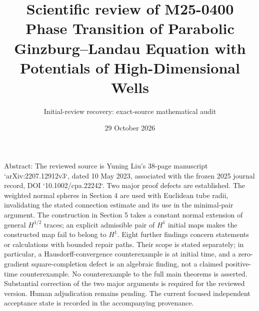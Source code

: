 \documentclass[10pt]{article}
\title{Scientific review of M25-0400
Phase Transition of Parabolic Ginzburg–Landau Equation
with Potentials of High-Dimensional Wells}
\author{Initial-review recovery: exact-source mathematical audit}
\date{29 October 2026}
\begin{document}
\maketitle
Abstract: The reviewed source is Yuning Liu’s 38-page manuscript `arXiv:2207.12912v3`, dated 10 May 2023, associated with the frozen 2025 journal record, DOI `10.1002/cpa.22242`. Two major proof defects are established. The weighted normal spheres in Section 4 are used with Euclidean tube radii, invalidating the stated connection estimate and its use in the minimal-pair argument. The construction in Section 5 takes a constant normal extension of general \(H^{1/2}\) traces; an explicit admissible pair of \(H^1\) initial maps makes the constructed map fail to belong to \(H^1\). Eight further findings concern statements or calculations with bounded repair paths. Their scope is stated separately; in particular, a Hausdorff-convergence counterexample is at initial time, and a zero-gradient square-completion defect is an algebraic finding, not a claimed positive-time counterexample. No counterexample to the full main theorems is asserted. Substantial correction of the two major arguments is required for the reviewed version. Human adjudication remains pending. The current focused independent acceptance state is recorded in the accompanying provenance.\par
\end{document}
